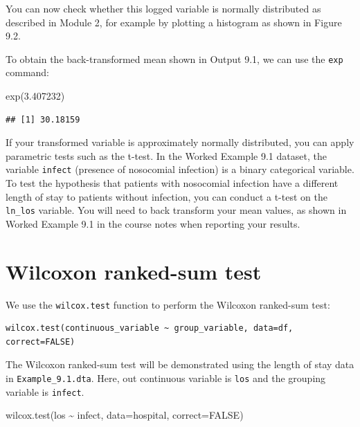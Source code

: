 \documentclass[
]{memoir}
\newenvironment{Shaded}{\begin{snugshade}}{\end{snugshade}}
\newcommand{\AttributeTok}[1]{\textcolor[rgb]{0.77,0.63,0.00}{#1}}
\newcommand{\ConstantTok}[1]{\textcolor[rgb]{0.00,0.00,0.00}{#1}}
\newcommand{\FloatTok}[1]{\textcolor[rgb]{0.00,0.00,0.81}{#1}}
\newcommand{\FunctionTok}[1]{\textcolor[rgb]{0.00,0.00,0.00}{#1}}
\newcommand{\NormalTok}[1]{#1}
\newcommand{\SpecialCharTok}[1]{\textcolor[rgb]{0.00,0.00,0.00}{#1}}
\begin{document}
You can now check whether this logged variable is normally distributed as described in Module 2, for example by plotting a histogram as shown in Figure 9.2.

To obtain the back-transformed mean shown in Output 9.1, we can use the \texttt{exp} command:

\begin{Shaded}
\begin{Highlighting}[]
\FunctionTok{exp}\NormalTok{(}\FloatTok{3.407232}\NormalTok{)}
\end{Highlighting}
\end{Shaded}

\begin{verbatim}
## [1] 30.18159
\end{verbatim}

If your transformed variable is approximately normally distributed, you can apply parametric tests such as the t-test. In the Worked Example 9.1 dataset, the variable \texttt{infect} (presence of nosocomial infection) is a binary categorical variable. To test the hypothesis that patients with nosocomial infection have a different length of stay to patients without infection, you can conduct a t-test on the \texttt{ln\_los} variable. You will need to back transform your mean values, as shown in Worked Example 9.1 in the course notes when reporting your results.

\hypertarget{wilcoxon-ranked-sum-test}{%
\section{Wilcoxon ranked-sum test}\label{wilcoxon-ranked-sum-test}}

We use the \texttt{wilcox.test} function to perform the Wilcoxon ranked-sum test:

\begin{verbatim}
wilcox.test(continuous_variable ~ group_variable, data=df, correct=FALSE)
\end{verbatim}

The Wilcoxon ranked-sum test will be demonstrated using the length of stay data in \texttt{Example\_9.1.dta}. Here, out continuous variable is \texttt{los} and the grouping variable is \texttt{infect}.

\begin{Shaded}
\begin{Highlighting}[]
\FunctionTok{wilcox.test}\NormalTok{(los }\SpecialCharTok{\textasciitilde{}}\NormalTok{ infect, }\AttributeTok{data=}\NormalTok{hospital, }\AttributeTok{correct=}\ConstantTok{FALSE}\NormalTok{)}
\end{Highlighting}
\end{Shaded}
\end{document}
